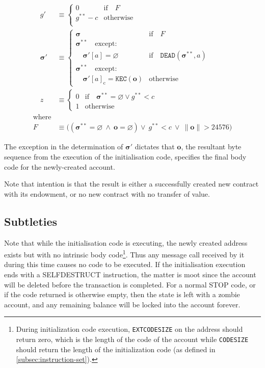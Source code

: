 \documentclass[9pt,oneside]{amsart}
\begin{document}
\begin{multicols}{2}
\begin{align}
\quad g' &\equiv \begin{cases}
0 & \text{if} \quad F \\
g^{**} - c & \text{otherwise} \\
\end{cases} \\
\quad \boldsymbol{\sigma}' &\equiv  \begin{cases}
\boldsymbol{\sigma} & \text{if} \quad F \\
\boldsymbol{\sigma}^{**} \quad \text{except:} & \\
\quad\boldsymbol{\sigma}'[a] = \varnothing & \text{if} \quad \mathtt{DEAD}(\boldsymbol{\sigma}^{**}, a) \\
\boldsymbol{\sigma}^{**} \quad \text{except:} & \\
\quad\boldsymbol{\sigma}'[a]_{\mathrm{c}} = \texttt{KEC}(\mathbf{o}) & \text{otherwise}
\end{cases} \\
\quad z &\equiv \begin{cases}
0 & \text{if} \quad \boldsymbol{\sigma}^{**} = \varnothing \lor g^{**} < c \\
1 & \text{otherwise}
\end{cases} \\
\nonumber \text{where} \\
F &\equiv \big((\boldsymbol{\sigma}^{**} = \varnothing \ \wedge\ \mathbf{o} = \varnothing) \vee\  g^{**} < c \ \vee\  \lVert \mathbf{o} \rVert > 24576\big)
\end{align}

The exception in the determination of $\boldsymbol{\sigma}'$ dictates that $\mathbf{o}$, the resultant byte sequence from the execution of the initialisation code, specifies the final body code for the newly-created account.

Note that intention is that the result is either a successfully created new contract with its endowment, or no new contract with no transfer of value.

\subsection{Subtleties}
Note that while the initialisation code is executing, the newly created address exists but with no intrinsic body code\footnote{During initialization code execution, \texttt{EXTCODESIZE} on the address should return zero, which is the length of the code of the account while \texttt{CODESIZE} should return the length of the initialization code (as defined in \ref{subsec:instruction-set}).}. Thus any message call received by it during this time causes no code to be executed. If the initialisation execution ends with a {\small SELFDESTRUCT} instruction, the matter is moot since the account will be deleted before the transaction is completed. For a normal {\small STOP} code, or if the code returned is otherwise empty, then the state is left with a zombie account, and any remaining balance will be locked into the account forever.


\end{multicols}
\end{document}
